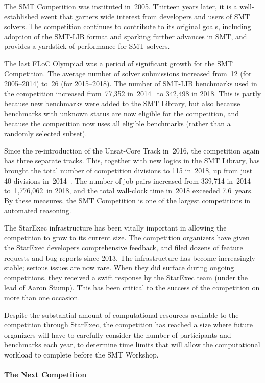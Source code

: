 \documentclass[dvipsnames,table,twoside,11pt]{article}
\newcommand{\ucoretrack}{Unsat-Core Track\xspace}
\begin{document}
The SMT Competition was instituted in~2005.  Thirteen years later, it
is a well-established event that garners wide interest from developers
and users of SMT solvers.  The competition continues to contribute to
its original goals, including adoption of the SMT-LIB format and
sparking further advances in SMT, and provides a yardstick of
performance for SMT solvers.

The last FLoC Olympiad was a period of significant growth for the SMT
Competition.  The average number of solver submissions increased
from~12 (for 2005--2014) to~26 (for 2015--2018).  The number of
SMT-LIB benchmarks used in the competition increased from~77,352
in~2014~\cite{CDW14} to 342,498 in 2018.  This is partly because new
benchmarks were added to the SMT Library, but also because benchmarks
with unknown status are now eligible for the competition, and because
the competition now uses all eligible benchmarks (rather than a
randomly selected subset).

Since the re-introduction of the \ucoretrack in~2016, the
competition again has three separate tracks.  This, together with new
logics in the SMT Library, has brought the total number of competition
divisions to 115 in~2018, up from just 40 divisions
in~2014~\cite{CDW14}.  The number of job pairs increased from 339,714
in~2014 to~1,776,062~in 2018, and the total wall-clock time in~2018
exceeded 7.6~years.  By these measures, the SMT Competition is one of
the largest competitions in automated reasoning.

The StarExec infrastructure has been vitally important in allowing the
competition to grow to its current size.  The competition organizers
have given the StarExec developers comprehensive feedback, and filed
dozens of feature requests and bug reports since 2013.  The
infrastructure has become increasingly stable; serious issues are now
rare.  When they did surface during ongoing competitions, they
received a swift response by the StarExec team (under the lead of
Aaron Stump).  This has been critical to the success of the
competition on more than one occasion.

Despite the substantial amount of computational resources available to
the competition through StarExec, the competition has reached a size
where future organizers will have to carefully consider the number of
participants and benchmarks each year, to determine time limits that
will allow the computational workload to complete before the SMT
Workshop.

\paragraph{The Next Competition}
\end{document}
